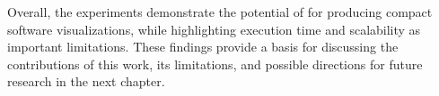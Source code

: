 \documentclass[../../main.tex]{subfiles}
\begin{document}
Overall, the experiments demonstrate the potential of \wassis for producing compact software visualizations, while highlighting execution time and scalability as important limitations. These findings provide a basis for discussing the contributions of this work, its limitations, and possible directions for future research in the next chapter.
\end{document}
